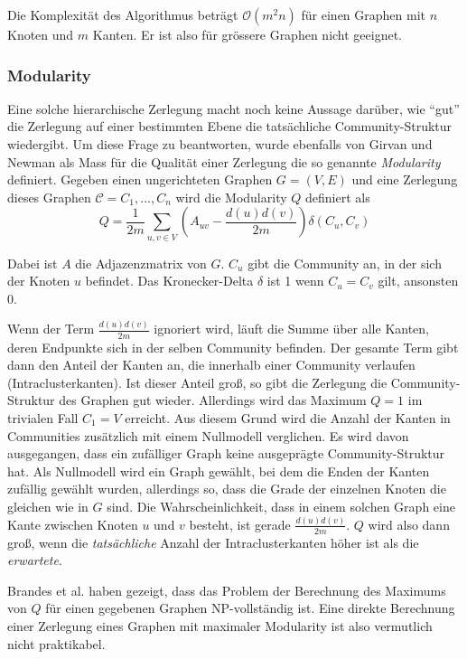 Die Komplexität des Algorithmus beträgt $\mathcal{O}(m^2n)$ für
einen Graphen mit $n$ Knoten und $m$ Kanten. Er ist also für
grössere Graphen nicht geeignet.

\subsubsection{Modularity}
\label{sec:modularity}

Eine solche hierarchische Zerlegung macht noch keine Aussage
darüber, wie ``gut'' die Zerlegung auf einer bestimmten Ebene die
tatsächliche Community-Struktur wiedergibt. Um diese Frage zu
beantworten, wurde ebenfalls von Girvan und Newman als Mass für die
Qualität einer Zerlegung die so genannte \emph{Modularity}
definiert\cite{Newman2004}. Gegeben einen ungerichteten Graphen $G=(V,
E)$ und eine Zerlegung dieses Graphen $\mathcal{C} = C_1, ..., C_n$
wird die Modularity $Q$ definiert als
\begin{equation}
  \label{eq:modularity}
  Q =
  \frac{1}{2m}\sum_{u, v \in
    V}\left(A_{uv}-\frac{d(u)d(v)}{2m}\right)\delta\left(C_u, C_v\right)
\end{equation}

Dabei ist $A$ die Adjazenzmatrix von $G$. $C_u$ gibt die Community an,
in der sich der Knoten $u$ befindet. Das Kronecker-Delta $\delta$
ist 1 wenn $C_u = C_v$ gilt, ansonsten 0.

Wenn der Term $\frac{d(u)d(v)}{2m}$ ignoriert wird, läuft die Summe
über alle Kanten, deren Endpunkte sich in der selben Community
befinden. Der gesamte Term gibt dann den Anteil der Kanten an, die
innerhalb einer Community verlaufen (Intraclusterkanten). Ist dieser Anteil groß, so gibt
die Zerlegung die Community-Struktur des Graphen gut
wieder. Allerdings wird das Maximum $Q = 1$ im trivialen Fall $C_1 =
V$ erreicht. Aus diesem Grund wird die Anzahl der Kanten in
Communities zusätzlich mit einem Nullmodell verglichen. Es wird
davon ausgegangen, dass ein zufälliger Graph keine ausgeprägte
Community-Struktur hat. Als Nullmodell wird ein Graph gewählt, bei
dem die Enden der Kanten zufällig gewählt wurden, allerdings so,
dass die Grade der einzelnen Knoten die gleichen wie in $G$ sind.  Die
Wahrscheinlichkeit, dass in einem solchen Graph eine Kante zwischen
Knoten $u$ und $v$ besteht, ist gerade $\frac{d(u)d(v)}{2m}$. $Q$ wird
also dann groß, wenn die \emph{tatsächliche} Anzahl der
Intraclusterkanten höher ist als die \emph{erwartete}.

Brandes et al. haben gezeigt, dass das Problem der Berechnung des
Maximums von $Q$ für einen gegebenen Graphen NP-vollständig
ist\cite{DBLP:journals/tkde/BrandesDGGHNW08}. Eine direkte Berechnung
einer Zerlegung eines Graphen mit maximaler Modularity ist also
vermutlich nicht praktikabel.

